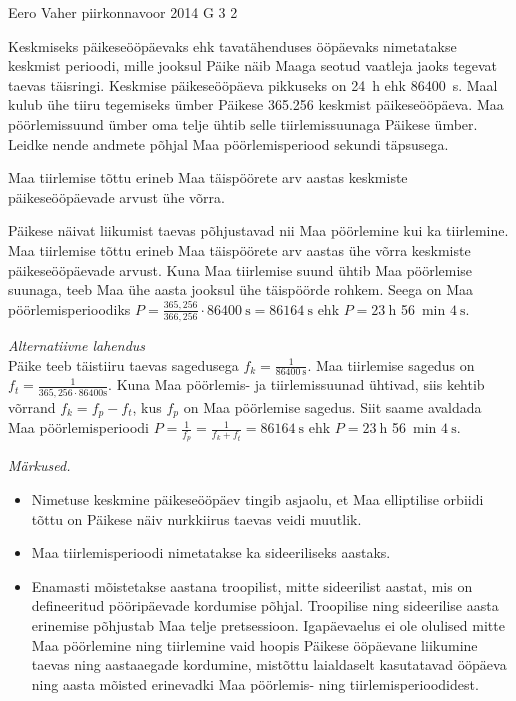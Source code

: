 {Eero Vaher} %
{piirkonnavoor} %
{2014} %
{G 3} %
{2} %
{
\ifStatement
Keskmiseks päikeseööpäevaks ehk tavatähenduses ööpäevaks nimetatakse keskmist perioodi, mille jooksul Päike näib Maaga seotud vaatleja jaoks tegevat taevas täisringi. Keskmise päikeseööpäeva pikkuseks on \SI{24}{\hour} ehk \SI{86400}{\second}. Maal kulub ühe tiiru tegemiseks ümber Päikese \SI{365.256}{} keskmist päikeseööpäeva. Maa pöörlemissuund ümber oma telje ühtib selle tiirlemissuunaga Päikese ümber. Leidke nende andmete põhjal Maa pöörlemisperiood sekundi täpsusega.  
\fi


\ifHint
Maa tiirlemise tõttu erineb Maa täispöörete arv aastas keskmiste päikeseööpäevade arvust ühe võrra.
\fi


\ifSolution
Päikese näivat liikumist taevas põhjustavad nii Maa pöörlemine kui ka tiirlemine. Maa tiirlemise tõttu erineb Maa täispöörete arv aastas ühe võrra keskmiste päikeseööpäevade arvust. Kuna Maa tiirlemise suund ühtib Maa pöörlemise suunaga, teeb Maa ühe aasta jooksul ühe täispöörde rohkem. Seega on Maa pöörlemisperioodiks $P=\frac{365,256}{366,256} \cdot \SI{86400}{\second}=\SI{86164}{\second}$ ehk $P=\SI{23}{\hour}$ \SI{56}{\minute} $\SI{4}{\second}$.

\vspace{0.5\baselineskip}
\emph{Alternatiivne lahendus}\\
Päike teeb täistiiru taevas sagedusega $f_k=\frac{1}{\SI{86400}{\second}}$. Maa tiirlemise sagedus on $f_t=\frac{1}{365,256\cdot86400\text{s}}$. Kuna Maa pöörlemis- ja tiirlemissuunad ühtivad, siis kehtib võrrand $f_k=f_p-f_t$, kus $f_p$ on Maa pöörlemise sagedus. Siit saame avaldada Maa pöörlemisperioodi $P=\frac{1}{f_p}=\frac{1}{f_k+f_t}=\SI{86164}{\second}$ ehk $P=\SI{23}{\hour}$ \SI{56}{\minute} $\SI{4}{\second}$.

\emph{Märkused.}

\vspace{-5pt}
\begin{itemize}[noitemsep, leftmargin=*]
\item Nimetuse keskmine päikeseööpäev tingib asjaolu, et Maa elliptilise orbiidi tõttu on Päikese näiv nurkkiirus taevas veidi muutlik.
\item Maa tiirlemisperioodi nimetatakse ka sideeriliseks aastaks. 
\item Enamasti mõistetakse aastana troopilist, mitte sideerilist aastat, mis on defineeritud pööripäevade kordumise põhjal. Troopilise ning sideerilise aasta erinemise põhjustab Maa telje pretsessioon. Igapäevaelus ei ole olulised mitte Maa pöörlemine ning tiirlemine vaid hoopis Päikese ööpäevane liikumine taevas ning aastaaegade kordumine, mistõttu laialdaselt kasutatavad ööpäeva ning aasta mõisted erinevadki Maa pöörlemis- ning tiirlemisperioodidest.  
\end{itemize}
\fi


}
